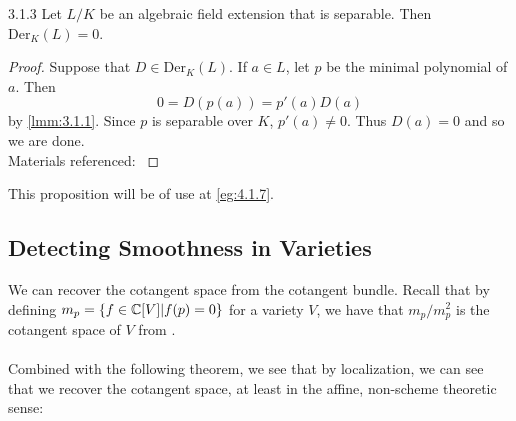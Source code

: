 \documentclass[a4paper]{article}
\begin{document}
\begin{prp}{}{3.1.3} Let $L/K$ be an algebraic field extension that is separable. Then $\text{Der}_K(L)=0$. \tcbline
\begin{proof}
Suppose that $D\in\text{Der}_K(L)$. If $a\in L$, let $p$ be the minimal polynomial of $a$. Then $$0=D(p(a))=p'(a)D(a)$$ by \ref{lmm:3.1.1}. Since $p$ is separable over $K$, $p'(a)\neq 0$. Thus $D(a)=0$ and so we are done. \\
Materials referenced: \cite{Pat}
\end{proof}
\end{prp}

This proposition will be of use at \ref{eg:4.1.7}. 

\subsection{Detecting Smoothness in Varieties}
We can recover the cotangent space from the cotangent bundle. Recall that by defining $m_p=\{f\in\mathbb{C}[V]|f(p)=0\}$ for a variety $V$, we have that $m_p/m_p^2$ is the cotangent space of $V$ from \cite{Sha}. \\~\\
Combined with the following theorem, we see that by localization, we can see that we recover the cotangent space, at least in the affine, non-scheme theoretic sense: 
\end{document}
